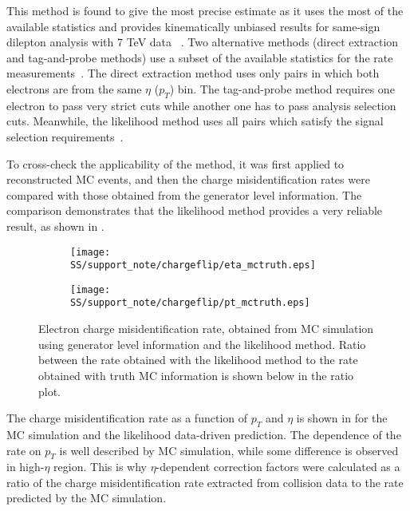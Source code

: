This method is found to give the most precise estimate as it uses the most of the available statistics and provides kinematically unbiased results
for same-sign dilepton analysis with 7 TeV data ~\cite{anthony_thesis}.
Two alternative methods (direct extraction and tag-and-probe methods)
use a subset of the available statistics for the rate measurements~\cite{cf_top_paper}.
The direct extraction method uses only pairs in which both electrons are from the same $\eta$ ($p_T$) bin. The tag-and-probe method requires one electron to pass very strict cuts while another one has to pass analysis selection cuts. Meanwhile, the likelihood method uses all pairs which satisfy the signal selection requirements~\cite{alonso_thesis}.

To cross-check the applicability of the method, it was first applied to reconstructed MC events, and then the charge misidentification rates were compared with those obtained from the generator level information. 
The comparison demonstrates that the likelihood method provides a very reliable result, as shown in
.

\begin{figure}
\begin{subfigure}{.5\textwidth}
  \centering
  \texttt{[image: SS/support\_note/chargeflip/eta\_mctruth.eps]}
\end{subfigure}%
\begin{subfigure}{.5\textwidth}
  \centering
  \texttt{[image: SS/support\_note/chargeflip/pt\_mctruth.eps]}
\end{subfigure}
\caption{Electron charge misidentification rate, obtained from MC simulation using generator level information and the likelihood method. 
Ratio between the rate obtained with the likelihood method to the rate obtained with truth MC information is shown below in the ratio plot. }
\label{fig:likelihood_cross_check}
\end{figure}

The charge misidentification rate as a function of $p_T$ and $\eta$ is shown in 
for the MC simulation and the likelihood data-driven prediction.
The dependence of the rate on $p_T$ is well described by MC simulation, while some difference is observed
in high-$\eta$ region. This is why $\eta$-dependent correction factors were calculated as a ratio of the charge misidentification rate extracted from collision data to the rate predicted by the MC simulation.

